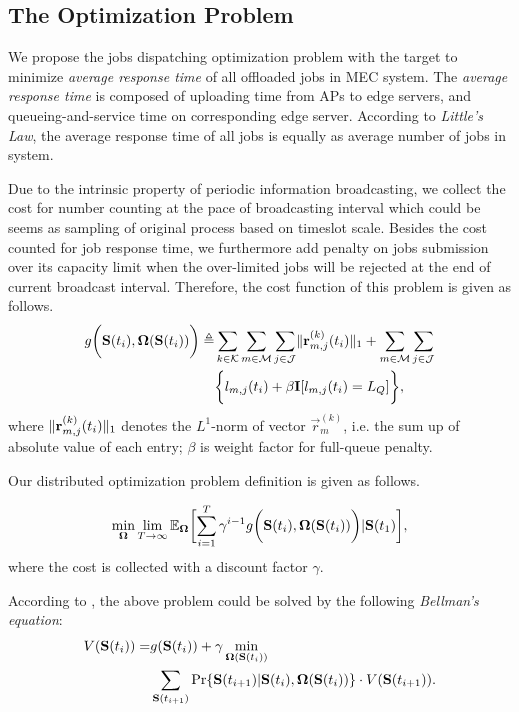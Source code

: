 \subsection{The Optimization Problem}
We propose the jobs dispatching optimization problem with the target to minimize \emph{average response time} of all offloaded jobs in MEC system.
The \emph{average response time} is composed of uploading time from APs to edge servers, and queueing-and-service time on corresponding edge server. According to \emph{Little's Law}, the average response time of all jobs is equally as average number of jobs in system.
        
Due to the intrinsic property of periodic information broadcasting, we collect the cost for number counting at the pace of broadcasting interval which could be seems as sampling of original process based on timeslot scale.
Besides the cost counted for job response time, we furthermore add penalty on jobs submission over its capacity limit when the over-limited jobs will be rejected at the end of current broadcast interval.
Therefore, the cost function of this problem is given as follows.
\begin{align}
    g\bigg(\mathbf{S}(t_{i}), \boldsymbol{\Omega}(\mathbf{S}(t_{i}))\bigg) \triangleq&
    \sum_{k\in\mathcal{K}}\sum_{m\in\mathcal{M}}\sum_{j\in\mathcal{J}} \lVert\mathbf{r}^{(k)}_{m,j}(t_{i})\|_1 + \sum_{m\in\mathcal{M}}\sum_{j\in\mathcal{J}}
    \nonumber\\
    &\bigg\{
        l_{m,j}(t_{i}) + \beta \mathbf{I}[l_{m,j}(t_{i})=L_Q]
    \bigg\},
\end{align}
where $\lVert\mathbf{r}^{(k)}_{m,j}(t_i)\|_1$ denotes the $L^1$-norm of vector $\vec{r}^{(k)}_{m}$, i.e. the sum up of absolute value of each entry; $\beta$ is weight factor for full-queue penalty.
        
Our distributed optimization problem definition is given as follows.
\begin{problem}
    \begin{gather}
        \min_{\Policy} \lim_{T \to \infty}
            \mathbb{E}_{\Policy}
                \Bracket{\sum_{i=1}^{T} \gamma^{i-1} g\Paren{\Stat(t_{i}), \Policy(\Stat(t_{i}))}|\Stat(t_1)},
    \end{gather}
    where the cost is collected with a discount factor $\gamma$.
\end{problem}
According to \cite{sutton1998introduction}, the above problem could be solved by the following \emph{Bellman's equation}:
\begin{align}
    V(\mathbf{S}(t_i)) = &g(\mathbf{S}(t_i)) + \gamma \min_{\boldsymbol{\Omega}(\mathbf{S}(t_{i}))}
        \nonumber\\
        & \sum_{\mathbf{S}(t_{i+1})} \Pr\{ \mathbf{S}(t_{i+1})|\mathbf{S}(t_{i}), \boldsymbol{\Omega}(\mathbf{S}(t_{i})) \} \cdot V(\mathbf{S}(t_{i+1})).
    \label{sp_0}
\end{align}

